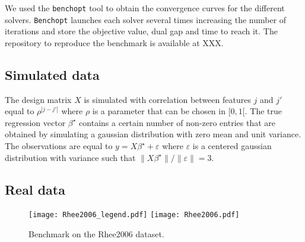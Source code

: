 We used the \texttt{benchopt} \cite{moreau2022benchopt} tool to obtain the convergence curves for the different solvers.
\texttt{Benchopt} launches each solver several times increasing the number of iterations and store the objective value, dual gap and time to reach it.
The repository to reproduce the benchmark is available at XXX.

\subsection{Simulated data}

The design matrix $X$ is simulated with correlation between features $j$ and $j'$ equal to $\rho^{|j-j'|}$ where $\rho$ is a parameter that can be chosen in $[0, 1[$. 
The true regression vector $\beta^\star$ contains a certain number of non-zero entries that are obtained by simulating a gaussian distribution with zero mean and unit variance.
The observations are equal to $y=X\beta^\star + \varepsilon$ where $\varepsilon$ is a centered gaussian distribution with variance such that $\lVert X\beta^\star\rVert / \lVert \varepsilon \rVert = 3$.

\subsection{Real data}
\begin{figure*}[htb]
  \centering
  \texttt{[image: Rhee2006\_legend.pdf]}
  \texttt{[image: Rhee2006.pdf]}
  \caption{Benchmark on the Rhee2006 dataset.}
  \label{fig:Rhee2006}
\end{figure*}
